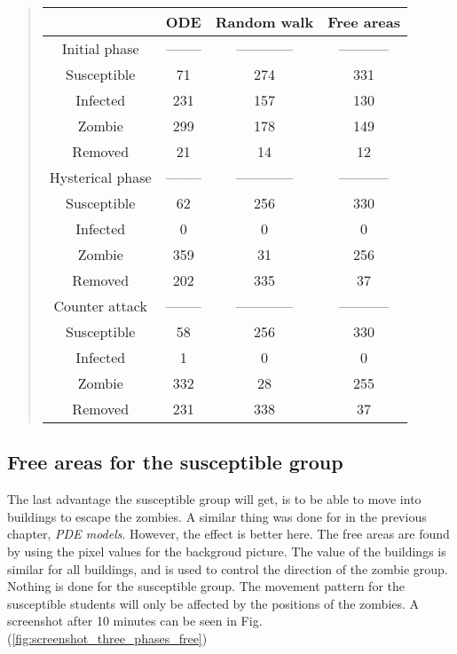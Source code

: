 \documentclass[%
twoside,                 %
final,                   %
chapterprefix=true,      %
open=right               %
10pt]{book}
\begin{document}
\label{table:compare_ODE_random}

\begin{quote}
\begin{tabular}{cccc}
\hline
\multicolumn{1}{c}{  } & \multicolumn{1}{c}{ ODE } & \multicolumn{1}{c}{ Random walk } & \multicolumn{1}{c}{ Free areas } \\
\hline
Initial phase    & -------- & ------------ & ----------- \\
\hline
Susceptible      & 71       & 274          & 331         \\
Infected         & 231      & 157          & 130         \\
Zombie           & 299      & 178          & 149         \\
Removed          & 21       & 14           & 12          \\
\hline
Hysterical phase & -------- & ------------ & ----------- \\
\hline
Susceptible      & 62       & 256          & 330         \\
Infected         & 0        & 0            & 0           \\
Zombie           & 359      & 31           & 256         \\
Removed          & 202      & 335          & 37          \\
\hline
Counter attack   & -------- & ------------ & ----------- \\
\hline
Susceptible      & 58       & 256          & 330         \\
Infected         & 1        & 0            & 0           \\
Zombie           & 332      & 28           & 255         \\
Removed          & 231      & 338          & 37          \\
\hline
\end{tabular}
\end{quote}

\noindent




\subsection{Free areas for the susceptible group}
The last advantage the susceptible group will get, is to be able to move into buildings to escape the zombies. A similar thing was done for in the previous chapter, \emph{PDE models}. However, the effect is better here. The free areas are found by using the pixel values for the backgroud picture. The value of the buildings is similar for all buildings, and is used to control the direction of the zombie group. Nothing is done for the susceptible group. The movement pattern for the susceptible students will only be affected by the positions of the zombies. A screenshot after 10 minutes can be seen in Fig.(\ref{fig:screenshot_three_phases_free})
\end{document}
